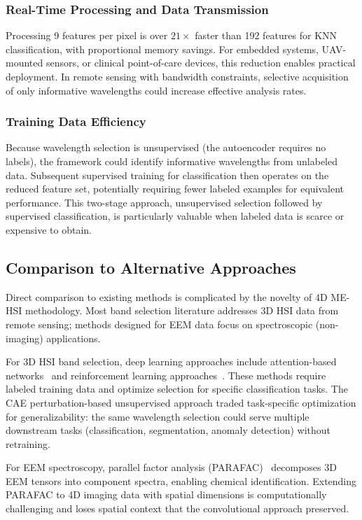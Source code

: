 \subsubsection{Real-Time Processing and Data Transmission}
Processing 9 features per pixel is over $21\times$ faster than 192 features for KNN classification, with proportional memory savings.
For embedded systems, UAV-mounted sensors, or clinical point-of-care devices, this reduction enables practical deployment.
In remote sensing with bandwidth constraints, selective acquisition of only informative wavelengths could increase effective analysis rates.

\subsubsection{Training Data Efficiency}
Because wavelength selection is unsupervised (the autoencoder requires no labels), the framework could identify informative wavelengths from unlabeled data.
Subsequent supervised training for classification then operates on the reduced feature set, potentially requiring fewer labeled examples for equivalent performance.
This two-stage approach, unsupervised selection followed by supervised classification, is particularly valuable when labeled data is scarce or expensive to obtain.

\subsection{Comparison to Alternative Approaches}
\label{sec:discussion_alternatives}

Direct comparison to existing methods is complicated by the novelty of 4D ME-HSI methodology.
Most band selection literature addresses 3D HSI data from remote sensing; methods designed for EEM data focus on spectroscopic (non-imaging) applications.

For 3D HSI band selection, deep learning approaches include attention-based networks~\cite{mou2017deep} and reinforcement learning approaches~\cite{roy2020hybridsn}.
These methods require labeled training data and optimize selection for specific classification tasks.
The CAE perturbation-based unsupervised approach traded task-specific optimization for generalizability: the same wavelength selection could serve multiple downstream tasks (classification, segmentation, anomaly detection) without retraining.

For EEM spectroscopy, parallel factor analysis (PARAFAC)~\cite{bro1997parafac} decomposes 3D EEM tensors into component spectra, enabling chemical identification.
Extending PARAFAC to 4D imaging data with spatial dimensions is computationally challenging and loses spatial context that the convolutional approach preserved.

